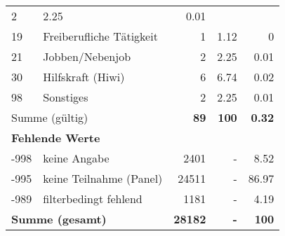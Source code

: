 \begin{longtable}{lXrrr}
       \num{2} &
       \num[round-mode=places,round-precision=2]{2.25} &
         \num[round-mode=places,round-precision=2]{0.01} \\

     19 &
     \multicolumn{1}{X}{ Freiberufliche Tätigkeit   } &


       \num{1} &
       \num[round-mode=places,round-precision=2]{1.12} &
         \num[round-mode=places,round-precision=2]{0} \\

     21 &
     \multicolumn{1}{X}{ Jobben/Nebenjob   } &


       \num{2} &
       \num[round-mode=places,round-precision=2]{2.25} &
         \num[round-mode=places,round-precision=2]{0.01} \\

     30 &
     \multicolumn{1}{X}{ Hilfskraft (Hiwi)   } &


       \num{6} &
       \num[round-mode=places,round-precision=2]{6.74} &
         \num[round-mode=places,round-precision=2]{0.02} \\

     98 &
     \multicolumn{1}{X}{ Sonstiges   } &


       \num{2} &
       \num[round-mode=places,round-precision=2]{2.25} &
         \num[round-mode=places,round-precision=2]{0.01} \\
     \midrule
     \multicolumn{2}{l}{Summe (gültig)} &
       \textbf{\num{89}} &
     \textbf{\num{100}} &
       \textbf{\num[round-mode=places,round-precision=2]{0.32}} \\
     \multicolumn{5}{l}{\textbf{Fehlende Werte}}\\
       -998 &
       keine Angabe &
         \num{2401} &
        - &
         \num[round-mode=places,round-precision=2]{8.52} \\
       -995 &
       keine Teilnahme (Panel) &
         \num{24511} &
        - &
         \num[round-mode=places,round-precision=2]{86.97} \\
       -989 &
       filterbedingt fehlend &
         \num{1181} &
        - &
         \num[round-mode=places,round-precision=2]{4.19} \\
     \midrule
     \multicolumn{2}{l}{\textbf{Summe (gesamt)}} &
          \textbf{\num{28182}} &
        \textbf{-} &
        \textbf{\num{100}} \\
     \bottomrule
     \end{longtable}
     
